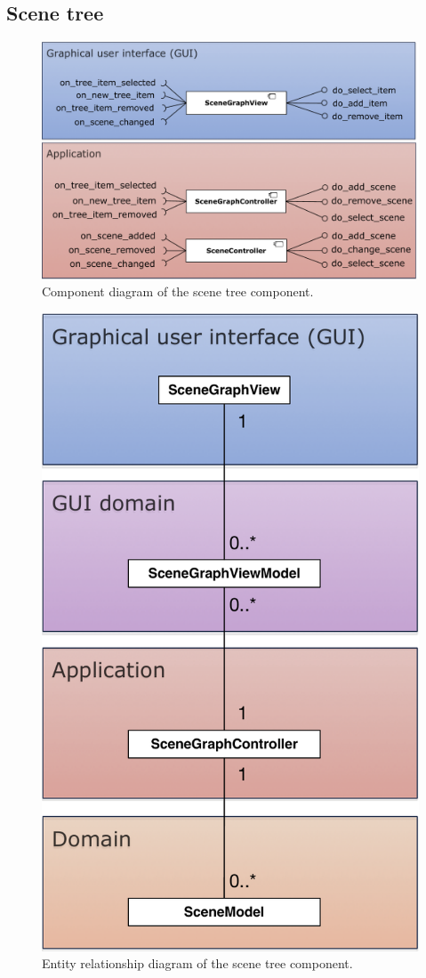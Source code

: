 \documentclass[%
    a4paper,    %
    justified,  %
    nobib,      %
    openany     %
]{tufte-book}
\makeatletter
\renewcommand{\label}[1]{\@tufte@label{##1}}%
\makeatother
\begin{document}
\subsection{Scene tree}
\label{results:subsec:program:scene-tree}

\begin{figure}[ht]
  \caption{Component diagram of the scene tree component.}
  \label{fig:scene-graph-component-diagram}
  \includegraphics[width=0.95\linewidth]{images/scene-graph-component-diagram}
\end{figure}

\begin{figure}[ht]
  \caption{Entity relationship diagram of the scene tree component.}
  \label{fig:scene-graph-erd}
  \includegraphics[width=0.75\linewidth]{images/scene-graph-erd}
\end{figure}
\end{document}
